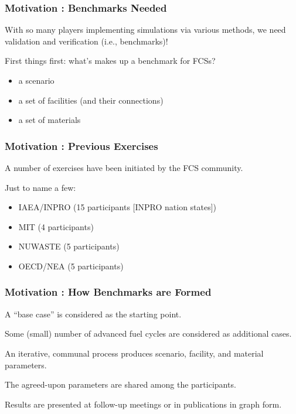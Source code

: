 
\begin{frame}[ctb!]
  \frametitle{Motivation : Benchmarks Needed} 
  With so many players implementing simulations via various methods, we need 
  validation and verification (i.e., benchmarks)!

  \vspace{0.4cm}

  First things first: what's makes up a benchmark for FCSs?

  \begin{itemize}
    \item a scenario
    \item a set of facilities (and their connections)
    \item a set of materials
  \end{itemize}
\end{frame}

\begin{frame}[ctb!]
  \frametitle{Motivation : Previous Exercises}
  A number of exercises have been initiated by the FCS community.

  \vspace{0.4cm}

  Just to name a few:
  \begin{itemize}
    \item IAEA/INPRO (15 participants [INPRO nation states])\cite{_international_2011}
    \item MIT (4 participants) \cite{guerin_benchmark_2009}
    \item NUWASTE (5 participants) \cite{abkowitz_workshop_2011}
    \item OECD/NEA (5 participants) \cite{boucher_benchmark_2012}
  \end{itemize}
\end{frame}

\begin{frame}[ctb!]
  \frametitle{Motivation : How Benchmarks are Formed}
  A ``base case'' is considered as the starting point.

  \vspace{0.4cm}

  Some (small) number of advanced fuel cycles are considered as additional cases.

  \vspace{0.4cm}

  An iterative, communal process produces scenario, facility, and material
  parameters.

  \vspace{0.4cm}

  The agreed-upon parameters are shared among the participants.

  \vspace{0.4cm}

  Results are presented at follow-up meetings or in publications in graph form.
\end{frame}

